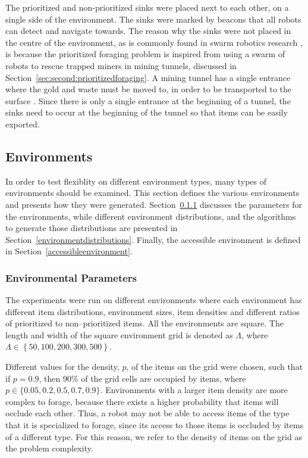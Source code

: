 \documentclass[preprint,12pt]{elsarticle}
\begin{document}
The prioritized and non-prioritized sinks were placed next to each other, on a single side of the environment. The sinks were marked by beacons that all robots can detect and navigate towards. The reason why the sinks were not placed in the centre of the environment, as is commonly found in swarm robotics research \cite{labella2006division}, is because the prioritized foraging problem is inspired from using a swarm of robots to rescue trapped miners in mining tunnels, discussed in Section~\ref{sec:second:prioritizedforaging}. A mining tunnel has a single entrance where the gold and waste must be moved to, in order to be transported to the surface \cite{brune2010extracting}. Since there is only a single entrance at the beginning of a tunnel, the sinks need to occur at the beginning of the tunnel so that items can be easily exported.

\subsection{Environments}
\label{experimentenvironments}

In order to test flexiblity on different environment types, many types of environments should be examined. This section defines the various environments and presents how they were generated. Section~\ref{environmentalparameters} discusses the parameters for the environments, while different environment distributions, and the algorithms to generate those distributions are presented in Section~\ref{environmentdistributions}. Finally, the accessible environment is defined in Section~\ref{accessibleenvironment}.

\subsubsection{Environmental Parameters}
\label{environmentalparameters}
The experiments were run on different environments where each environment has different item distributions, environment sizes, item densities and different ratios of prioritized to non--prioritized items. All the environments are square. The length and width of the square environment grid is denoted as $\Lambda$, where $\Lambda\in \left\{ 50, 100, 200, 300, 500\right\}$.

Different values for the density, $p$, of the items on the grid were chosen, such that if $p=0.9$, then 90\% of the grid cells are occupied by items, where $p\in \{ 0.05,\allowbreak 0.2,\allowbreak 0.5,\allowbreak 0.7,\allowbreak 0.9\}$. Environments with a larger item density are more complex to forage, because there exists a higher probability that items will occlude each other. Thus, a robot may not be able to access items of the type that it is specialized to forage, since its access to those items is occluded by items of a different type. For this reason, we refer to the density of items on the grid as the problem complexity.
\end{document}
